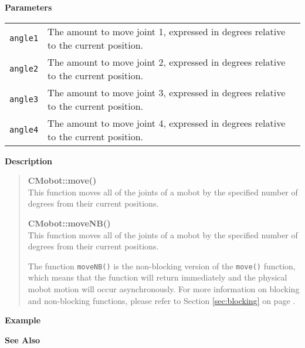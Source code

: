 \noindent
{\bf Parameters}\\
\vspace{-0.1in}
\begin{description}
\item               
\begin{tabular}{p{15 mm}p{105 mm}}
\texttt{angle1} & The amount to move joint 1, expressed in degrees relative to the current position. \\
\texttt{angle2} & The amount to move joint 2, expressed in degrees relative to the current position. \\
\texttt{angle3} & The amount to move joint 3, expressed in degrees relative to the current position. \\
\texttt{angle4} & The amount to move joint 4, expressed in degrees relative to the current position. \\
\end{tabular}
\end{description}
\noindent
{\bf Description}\\
\vspace{-12pt}
\begin{quote}
{\bf CMobot::move()}\\
This function moves all of the joints of a mobot by the specified number of degrees
from their current positions. 

{\bf CMobot::moveNB()}\\
This function moves all of the joints of a mobot by the specified number of degrees
from their current positions. 

The function \texttt{moveNB()} is the non-blocking version of
the \texttt{move()} function, which means that the function will return
immediately and the physical mobot motion will occur asynchronously. For 
more information on blocking and non-blocking functions, please refer to 
Section \ref{sec:blocking} on page \pageref{sec:blocking}.\\
\end{quote}

\noindent
{\bf Example}\\
\noindent

\noindent
{\bf See Also}\\

